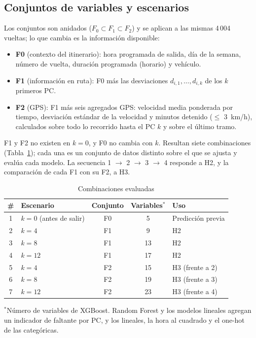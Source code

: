 \documentclass[conference]{IEEEtran}
\newcommand{\tablesize}{\fontsize{7}{8.4}\selectfont}
\begin{document}
\subsection{Conjuntos de variables y escenarios}
Los conjuntos son anidados ($F_0 \subset F_1 \subset F_2$) y se aplican a las mismas 4\,004 vueltas; lo que cambia es la información disponible:
\begin{itemize}
\item \textbf{F0} (contexto del itinerario): hora programada de salida, día de la semana, número de vuelta, duración programada (horario) y vehículo.
\item \textbf{F1} (información en ruta): F0 más las desviaciones $d_{i,1}, \ldots, d_{i,k}$ de los $k$ primeros PC.
\item \textbf{F2} (GPS): F1 más seis agregados GPS: velocidad media ponderada por tiempo, desviación estándar de la velocidad y minutos detenido ($\leq$ 3~km/h), calculados sobre todo lo recorrido hasta el PC $k$ y sobre el último tramo.
\end{itemize}
F1 y F2 no existen en $k = 0$, y F0 no cambia con $k$. Resultan siete combinaciones (Tabla~\ref{tab:esc}); cada una es un conjunto de datos distinto sobre el que se ajusta y evalúa cada modelo. La secuencia 1 $\rightarrow$ 2 $\rightarrow$ 3 $\rightarrow$ 4 responde a H2, y la comparación de cada F1 con su F2, a H3.

\begin{table}[!t]
\centering
\caption{Combinaciones evaluadas}\label{tab:esc}
\tablesize
\begin{tabular}{@{}clccl@{}}
\toprule
\# & Escenario & Conjunto & Variables$^{*}$ & Uso \\
\midrule
1 & $k = 0$ (antes de salir) & F0 & 5 & Predicción previa \\
2 & $k = 4$ & F1 & 9 & H2 \\
3 & $k = 8$ & F1 & 13 & H2 \\
4 & $k = 12$ & F1 & 17 & H2 \\
5 & $k = 4$ & F2 & 15 & H3 (frente a 2) \\
6 & $k = 8$ & F2 & 19 & H3 (frente a 3) \\
7 & $k = 12$ & F2 & 23 & H3 (frente a 4) \\
\bottomrule
\end{tabular}

\vspace{2pt}\raggedright\scriptsize $^{*}$Número de variables de XGBoost. Random Forest y los modelos lineales agregan un indicador de faltante por PC, y los lineales, la hora al cuadrado y el one-hot de las categóricas.
\end{table}
\end{document}
